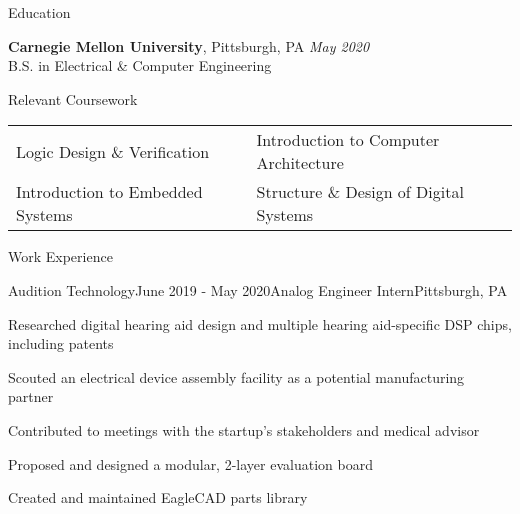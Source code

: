\documentclass{resume} %
\begin{document}

\begin{Section}{Education}

{\bf Carnegie Mellon University}, Pittsburgh, PA \hfill {\em May 2020}
\\ B.S. in Electrical \& Computer Engineering\hfill %

\end{Section}

\begin{Section}{Relevant Coursework}

\begin{tabular}{ll}

Logic Design \& Verification & Introduction to Computer Architecture \\
Introduction to Embedded Systems & Structure \& Design of Digital Systems \\
\end{tabular}

\end{Section}


\begin{Section}{Work Experience}

\begin{Subsection}{Audition Technology}{June 2019 - May 2020}{Analog Engineer Intern}{Pittsburgh, PA}
\item Researched digital hearing aid design and multiple hearing aid-specific DSP chips, including patents
\item Scouted an electrical device assembly facility as a potential manufacturing partner
\item Contributed to meetings with the startup's stakeholders and medical advisor
\item Proposed and designed a modular, 2-layer evaluation board
\item Created and maintained EagleCAD parts library
\end{Subsection}

\end{Section}
\end{document}
